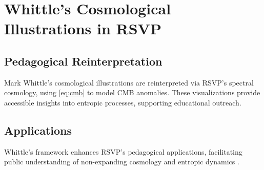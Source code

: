 \documentclass[12pt]{report}
\begin{document}
\chapter{Whittle’s Cosmological Illustrations in RSVP}
\label{app:Z}
\section{Pedagogical Reinterpretation}
Mark Whittle’s cosmological illustrations \citep{Whittle2008} are reinterpreted via RSVP’s spectral cosmology, using \eqref{eq:cmb} to model CMB anomalies. These visualizations provide accessible insights into entropic processes, supporting educational outreach.

\section{Applications}
Whittle’s framework enhances RSVP’s pedagogical applications, facilitating public understanding of non-expanding cosmology and entropic dynamics \citep{RSVPMeta2025}.



\end{document}
